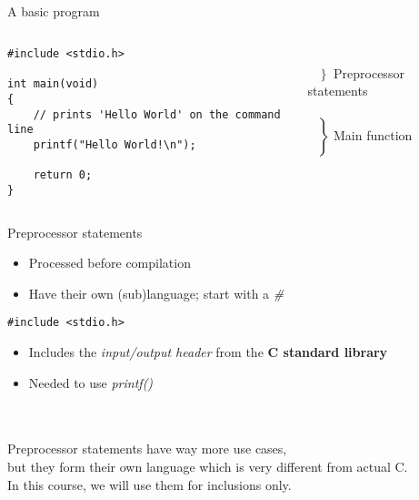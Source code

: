 \subsection{}
\begin{frame}[fragile]{A basic program}
	\begin{columns}[T]
		\begin{lstlisting}
#include <stdio.h>

int main(void)
{
	// prints 'Hello World' on the command line
	printf("Hello World!\n");

	return 0;
}
\end{lstlisting}
		
		\ \\$\left. \begin{array}{c}\\\end{array}\right\rbrace $ Preprocessor statements
		\ \\\ \\$\left. \begin{array}{c}\\\\\\\\\\\end{array}\right\rbrace $ Main function
	\end{columns}
\end{frame}
\begin{frame}[fragile]{Preprocessor statements}
	\begin{itemize}
		\item Processed before compilation
		\item Have their own (sub)language; start with a \textit{\#}
	\end{itemize}
	\begin{lstlisting}
#include <stdio.h>
\end{lstlisting}
	\begin{itemize}
		\item Includes the \textit{input/output header} from the \textbf{C standard library}
		\item Needed to use \textit{printf()}
	\end{itemize}\ \\ \ \\
	Preprocessor statements have way more use cases,\\
	but they form their own language which is very different from actual C.\\
	\bigskip
	In this course, we will use them for inclusions only.
\end{frame}
